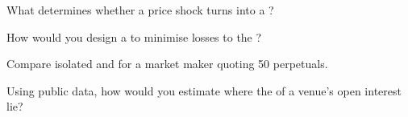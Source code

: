 \begin{interviewq}\label{iq:m3:margin-liquidation-and-loss-allocation:3}
What determines whether a price shock turns into a ?
\end{interviewq}

\begin{interviewq}\label{iq:m3:margin-liquidation-and-loss-allocation:4}
How would you design a  to minimise losses to the ?
\end{interviewq}

\begin{interviewq}\label{iq:m3:margin-liquidation-and-loss-allocation:5}
Compare isolated and  for a market maker quoting 50 perpetuals.
\end{interviewq}

\begin{interviewq}\label{iq:m3:margin-liquidation-and-loss-allocation:6}
Using public data, how would you estimate where the  of a venue's open interest lie?
\end{interviewq}
